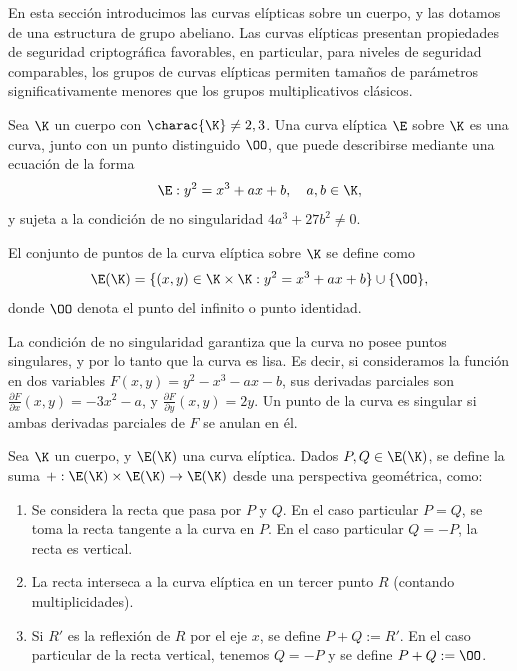
En esta sección introducimos las curvas elípticas sobre un cuerpo, y las dotamos de una estructura de grupo abeliano. Las curvas elípticas presentan propiedades de seguridad criptográfica favorables, en particular, para niveles de seguridad comparables, los grupos de curvas elípticas permiten tamaños de parámetros significativamente menores que los grupos multiplicativos clásicos.

\begin{definition}
	Sea $\K$ un cuerpo con $\charac{\K} \neq 2,3$. Una curva elíptica $\E$ sobre $\K$ es una curva, junto con un punto distinguido $\OO$, que puede describirse mediante una ecuación de la forma
	$$\E: y^2 = x^3 + ax + b, \quad a,b \in \K,$$
	y sujeta a la condición de no singularidad $4a^3 + 27b^2 \neq 0$.
	
	El conjunto de puntos de la curva elíptica sobre $\K$ se define como
	$$\E(\K) = \{(x,y) \in \K \times \K: y^2 = x^3 + ax + b\} \cup \{\OO\},$$
	donde $\OO$ denota el punto del infinito o punto identidad.
\end{definition}

La condición de no singularidad garantiza que la curva no posee puntos singulares, y por lo tanto que la curva es lisa. Es decir, si consideramos la función en dos variables $F(x,y) = y^2 - x^3 - ax - b$, sus derivadas parciales son $\frac{\partial F}{\partial x}(x,y) = -3x^2 - a$, y $\frac{\partial F}{\partial y}(x,y) = 2y$. Un punto de la curva es singular si ambas derivadas parciales de $F$ se anulan en él.

\begin{definition}
	Sea $\K$ un cuerpo, y $\E(\K)$ una curva elíptica. Dados $P, Q \in \E(\K)$, se define la suma $+: \E(\K) \times \E(\K) \to \E(\K)$ desde una perspectiva geométrica, como:
	\begin{enumerate}
		\item Se considera la recta que pasa por $P$ y $Q$. En el caso particular $P = Q$, se toma la recta tangente a la curva en $P$. En el caso particular $Q = -P$, la recta es vertical.
		\item La recta interseca a la curva elíptica en un tercer punto $R$ (contando multiplicidades).
		\item Si $R'$ es la reflexión de $R$ por el eje $x$, se define $P + Q := R'$. En el caso particular de la recta vertical, tenemos $Q = -P$ y se define $P + Q := \OO$.
	\end{enumerate}
\end{definition}

